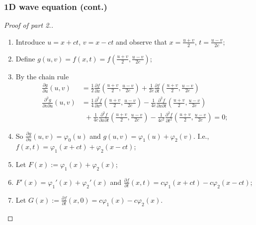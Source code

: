 \documentclass[aspectratio=169,handout]{beamer}
\begin{document}
\begin{frame}
    \frametitle{1D wave equation (cont.)}
    \begin{proof}[Proof of part 2.]
        \begin{enumerate}
            \item Introduce \(u = x + ct\), \(v=x-ct\)
                  and observe that \(x = \frac{u+v}{2}\), \(t=\frac{u-v}{2c}\);
            \item Define \(g(u,v) = f(x,t) = f(   \frac{u+v}{2} , \frac{u-v}{2c} )\);
            \item By the chain rule
                  \[
                      \begin{aligned}
                          \tfrac{\partial g}{\partial u}(u,v)
                           & = \tfrac{1}{2} \tfrac{\partial f}{\partial x}(   \tfrac{u+v}{2} , \tfrac{u-v}{2c} )
                          + \tfrac{1}{2c} \tfrac{\partial f}{\partial t}(   \tfrac{u+v}{2} , \tfrac{u-v}{2c} )                      \\
                          \tfrac{\partial^2 g}{\partial v \partial u}(u,v)
                           & = \tfrac{1}{4} \tfrac{\partial^2 f}{\partial x^2}(   \tfrac{u+v}{2} , \tfrac{u-v}{2c} )
                          - \tfrac{1}{4c} \tfrac{\partial^2 f}{\partial x\partial t}(   \tfrac{u+v}{2} , \tfrac{u-v}{2c} )          \\
                           & \ \ +  \tfrac{1}{4c} \tfrac{\partial^2 f}{\partial x \partial t}(   \tfrac{u+v}{2} , \tfrac{u-v}{2c} )
                          -  \tfrac{1}{4c^2} \tfrac{\partial^2 f}{\partial t^2}(   \tfrac{u+v}{2} , \tfrac{u-v}{2c} ) = 0;
                      \end{aligned}
                  \]
            \item So \( \tfrac{\partial g}{\partial u}(u,v) = \varphi_0(u)\) and \(g(u,v) = \varphi_1(u) + \varphi_2(v)\).
                  I.e., \(f(x,t) = \varphi_1(x+ct) + \varphi_2(x-ct)\);
            \item Let \(F(x) := \varphi_1(x) + \varphi_2(x)\);
            \item \(F'(x) = \varphi_1'(x) + \varphi_2'(x)\)
                  and \(\frac{\partial f}{\partial t}(x,t) = c\varphi_1(x+ct) - c\varphi_2(x-ct)\);
            \item Let \(G(x) := \frac{\partial f}{\partial t}(x,0) = c\varphi_1(x) - c\varphi_2(x)\).
        \end{enumerate}
    \end{proof}
\end{frame}
\end{document}
